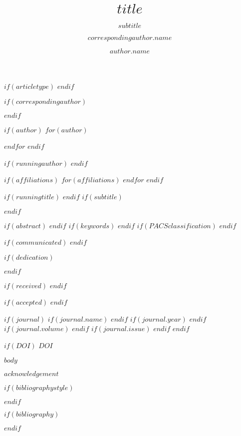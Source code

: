 \documentclass[USenglish]{article}
\begin{document}
$if(articletype)$
$endif$


$if(correspondingauthor)$
  \author*[$correspondingauthor.affiliation$]{$correspondingauthor.name$}
$endif$

$if(author)$
$for(author)$
  \author[$author.affiliation$]{$author.name$}
$endfor$
$endif$

$if(runningauthor)$
$endif$

$if(affiliations)$
$for(affiliations)$
$endfor$
$endif$

  \title{$title$}
$if(runningtitle)$
$endif$
$if(subtitle)$
  \subtitle{$subtitle$}
$endif$

$if(abstract)$
$endif$
$if(keywords)$
$endif$
$if(PACSclassification)$
$endif$

$if(communicated)$
$endif$

$if(dedication)$
  \dedication{$dedication$}
$endif$

$if(received)$
$endif$

$if(accepted)$
$endif$

$if(journal)$
$if(journal.name)$
$endif$
$if(journal.year)$
$endif$
$if(journal.volume)$
$endif$
$if(journal.issue)$
$endif$
$endif$
  \aop

$if(DOI)$
$DOI$

\maketitle

$body$

\begin{acknowledgement}
  $acknowledgement$
\end{acknowledgement}

$if(bibliographystyle)$

$endif$

$if(bibliography)$

$endif$
\end{document}
